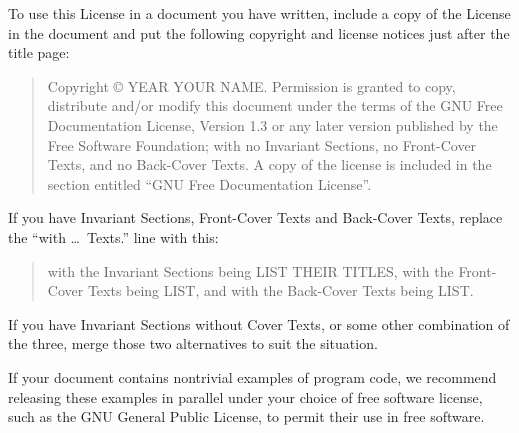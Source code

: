 \ifdefined\chs

\fi

\ifdefined\eng
To use this License in a document you have written, include a copy of
the License in the document and put the following copyright and
license notices just after the title page:
\fi

\ifdefined\chs

\fi

\ifdefined\eng
\bigskip
\begin{quote}
    Copyright \copyright{}  YEAR  YOUR NAME.
    Permission is granted to copy, distribute and/or modify this document
    under the terms of the GNU Free Documentation License, Version 1.3
    or any later version published by the Free Software Foundation;
    with no Invariant Sections, no Front-Cover Texts, and no Back-Cover Texts.
    A copy of the license is included in the section entitled ``GNU
    Free Documentation License''.
\end{quote}
\bigskip
    
If you have Invariant Sections, Front-Cover Texts and Back-Cover Texts,
replace the ``with \dots\ Texts.'' line with this:
\fi

\ifdefined\chs

\fi

\ifdefined\eng
\bigskip
\begin{quote}
    with the Invariant Sections being LIST THEIR TITLES, with the
    Front-Cover Texts being LIST, and with the Back-Cover Texts being LIST.
\end{quote}
\bigskip
    
If you have Invariant Sections without Cover Texts, or some other
combination of the three, merge those two alternatives to suit the
situation.
\fi

\ifdefined\chs

\fi

\ifdefined\eng
If your document contains nontrivial examples of program code, we
recommend releasing these examples in parallel under your choice of
free software license, such as the GNU General Public License,
to permit their use in free software.
